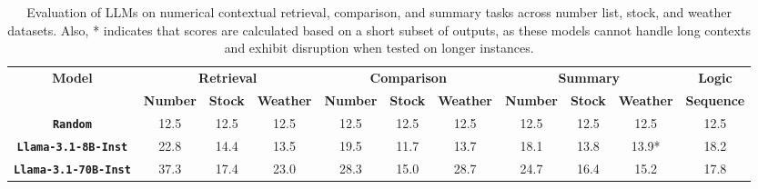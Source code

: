 \begin{table*}[t]
	\centering
		\vspace{-2em}
	\setlength\tabcolsep{2pt}
	\footnotesize
	\caption{Evaluation of LLMs on numerical contextual retrieval, comparison, and summary tasks across number list, stock, and weather datasets. 
		Also, * indicates that scores are calculated based on a short subset of outputs, as these models cannot handle  long contexts and exhibit disruption when tested on longer instances.}
	\begin{tabular}{c|ccc|ccc|ccc|c}
		\toprule
		\multirow{2}{*}{\textbf{Model}} & \multicolumn{3}{c|}{\textbf{Retrieval}}                                                         & \multicolumn{3}{c|}{\textbf{Comparison}}                                                           & \multicolumn{3}{c|}{\textbf{Summary}}                                                           & \textbf{Logic}    \\ \cmidrule{2-11} 
		
		& \multicolumn{1}{c}{\textbf{Number}} & \multicolumn{1}{c}{\textbf{Stock}} & \textbf{Weather} & \multicolumn{1}{c}{\textbf{Number}} & \multicolumn{1}{c}{\textbf{Stock}} & \textbf{Weather} & \multicolumn{1}{c}{\textbf{Number}} & \multicolumn{1}{c}{\textbf{Stock}} & \textbf{Weather} & \textbf{Sequence} \\ \midrule
		
		\textbf{\texttt{Random}} & \multicolumn{1}{c}{12.5}                  & \multicolumn{1}{c}{12.5}               &          12.5        & \multicolumn{1}{c}{12.5}                  & \multicolumn{1}{c}{12.5}               &                 12.5 & \multicolumn{1}{c}{12.5}                  & \multicolumn{1}{c}{12.5}               &      12.5            &         12.5          \\ \midrule
		
		
		\textbf{\texttt{Llama-3.1-8B-Inst}}& \multicolumn{1}{c}{22.8}                  & \multicolumn{1}{c}{14.4}               &      13.5          & \multicolumn{1}{c}{19.5}                  & \multicolumn{1}{c}{11.7}               &     13.7            & \multicolumn{1}{c}{18.1}                  & \multicolumn{1}{c}{13.8}               &       13.9*          &       18.2            \\  
		
		\textbf{\texttt{Llama-3.1-70B-Inst}}& \multicolumn{1}{c}{37.3}                  & \multicolumn{1}{c}{17.4}               &     23.0             & \multicolumn{1}{c}{28.3}                  & \multicolumn{1}{c}{15.0}               &     28.7             & \multicolumn{1}{c}{24.7}                  & \multicolumn{1}{c}{16.4}               &       15.2           &     17.8              \\  
		

\end{tabular}
\end{table*}
